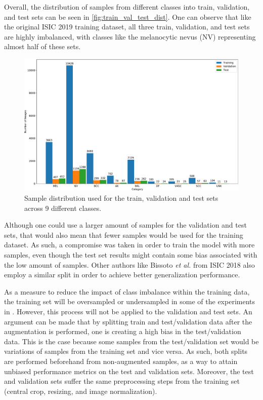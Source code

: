     Overall, the distribution of samples from different classes into train, validation, and test sets can be seen in \autoref{fig:train_val_test_dist}. One can observe that like the original \ac{ISIC} 2019 training dataset, all three train, validation, and test sets are highly imbalanced, with classes like the melanocytic nevus (NV) representing almost half of these sets. \par
    
    \begin{figure}[ht]
        \centering
        \includegraphics[width=\textwidth]{figs/train_val_test_dist.pdf}
        \caption{Sample distribution used for the train, validation and test sets across 9 different classes.}
        \label{fig:train_val_test_dist}
    \end{figure}
    
    Although one could use a larger amount of samples for the validation and test sets, that would also mean that fewer samples would be used for the training dataset. As such, a compromise was taken in order to train the model with more samples, even though the test set results might contain some bias associated with the low amount of samples. Other authors like Bissoto \textit{et al.} \cite{Bissoto2018} from \ac{ISIC} 2018 also employ a similar split in order to achieve better generalization performance. \par
    
    As a measure to reduce the impact of class imbalance within the training data, the training set will be oversampled or undersampled in some of the experiments in . However, this process will not be applied to the validation and test sets. An argument can be made that by splitting train and test/validation data after the augmentation is performed, one is creating a high bias in the test/validation data. This is the case because some samples from the test/validation set would be variations of samples from the training set and vice versa. As such, both splits are performed beforehand from non-augmented samples, as a way to attain unbiased performance metrics on the test and validation sets. Moreover, the test and validation sets suffer the same preprocessing steps from the training set (central crop, resizing, and image normalization). \par 
    
